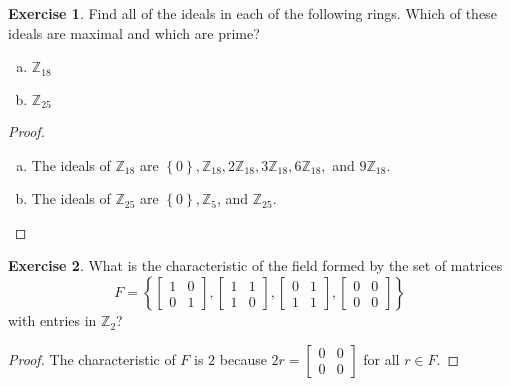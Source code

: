 \documentclass{article}
\theoremstyle{definition}
\newtheorem{theorem}{Exercise}[section]
\theoremstyle{plain}
\newcommand{\Z}{\mathbb{Z}}
\begin{document}
	\begin{theorem}
		Find all of the ideals in each of the following rings. Which of these ideals are maximal and which are prime?
		\begin{multicols}{2}
			\begin{enumerate}[(a)]
			\item $\Z_{18}$
			\item $\Z_{25}$
		\end{enumerate}
		\end{multicols}
	\end{theorem}
	\begin{proof}\hfill 
		\begin{enumerate}[(a)]
			\item The ideals of $\Z_{18}$ are $\left\{ 0 \right\}, \Z_{18}, 2\Z_{18}, 3\Z_{18}, 6\Z_{18},$ and $9\Z_{18}$.
			\item The ideals of $\Z_{25}$ are $\left\{ 0 \right\}, \Z_5$, and $\Z_{25}$.
		\end{enumerate}
	\end{proof}

	\setcounter{theorem}{8}
	\begin{theorem}
		What is the characteristic of the field formed by the set of matrices \[ F = \left\{ \begin{bmatrix} 1 & 0 \\ 0 & 1 \end{bmatrix}, \begin{bmatrix} 1 & 1\\ 1 & 0 \end{bmatrix}, \begin{bmatrix} 0 & 1 \\ 1 & 1 \end{bmatrix}, \begin{bmatrix} 0 & 0 \\ 0 & 0 \end{bmatrix}  \right\} \] with entries in $\Z_2$?
	\end{theorem}
	\begin{proof}
		The characteristic of $F$ is $2$ because $2r = \left[ \begin{smallmatrix} 0 & 0\\ 0 & 0 \end{smallmatrix} \right]$ for all $r\in F$. 
	\end{proof}
	
\end{document}
